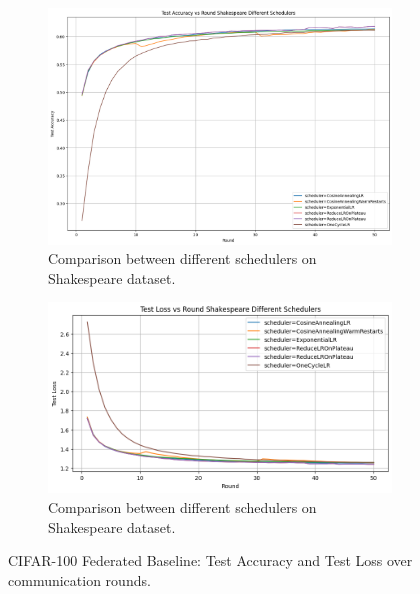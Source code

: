 \documentclass[10pt,twocolumn,letterpaper]{article}
\begin{document}
 \begin{figure}[H]
    \centering
    \begin{subfigure}{0.48\linewidth}
        \centering
        \includegraphics[width=\linewidth]{images/graph_shakespeare.png}


        \caption{Comparison between different schedulers on Shakespeare dataset.}

        \label{fig:short-b}
    \end{subfigure}
    \hfill
    \begin{subfigure}{0.48\linewidth}
        \centering
        \includegraphics[width=\linewidth]{images/shakespeare_loss.png}

        \caption{Comparison between different schedulers on Shakespeare dataset.}

        \label{fig:short-b}
    \end{subfigure}
    \caption{CIFAR-100 Federated Baseline: Test Accuracy and Test Loss over communication rounds.}
    \label{fig:cifarBaseline}
\end{figure}
\end{document}

